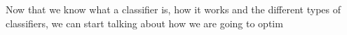 Now that we know what a classifier is, how it works and the different types of classifiers, we can start talking about how we are going to optim